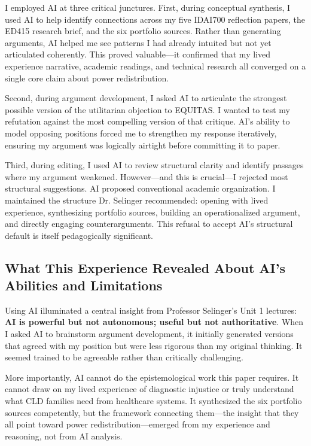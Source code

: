 \documentclass[12pt,a4paper]{article}
\begin{document}
I employed AI at three critical junctures. First, during conceptual synthesis, I used AI to help identify connections across my five IDAI700 reflection papers, the ED415 research brief, and the six portfolio sources. Rather than generating arguments, AI helped me see patterns I had already intuited but not yet articulated coherently. This proved valuable---it confirmed that my lived experience narrative, academic readings, and technical research all converged on a single core claim about power redistribution.

Second, during argument development, I asked AI to articulate the strongest possible version of the utilitarian objection to EQUITAS. I wanted to test my refutation against the most compelling version of that critique. AI's ability to model opposing positions forced me to strengthen my response iteratively, ensuring my argument was logically airtight before committing it to paper.

Third, during editing, I used AI to review structural clarity and identify passages where my argument weakened. However---and this is crucial---I rejected most structural suggestions. AI proposed conventional academic organization. I maintained the structure Dr. Selinger recommended: opening with lived experience, synthesizing portfolio sources, building an operationalized argument, and directly engaging counterarguments. This refusal to accept AI's structural default is itself pedagogically significant.

\subsection{What This Experience Revealed About AI's Abilities and Limitations}

Using AI illuminated a central insight from Professor Selinger's Unit 1 lectures: \textbf{AI is powerful but not autonomous; useful but not authoritative}. When I asked AI to brainstorm argument development, it initially generated versions that agreed with my position but were less rigorous than my original thinking. It seemed trained to be agreeable rather than critically challenging.

More importantly, AI cannot do the epistemological work this paper requires. It cannot draw on my lived experience of diagnostic injustice or truly understand what CLD families need from healthcare systems. It synthesized the six portfolio sources competently, but the framework connecting them---the insight that they all point toward power redistribution---emerged from my experience and reasoning, not from AI analysis.
\end{document}
